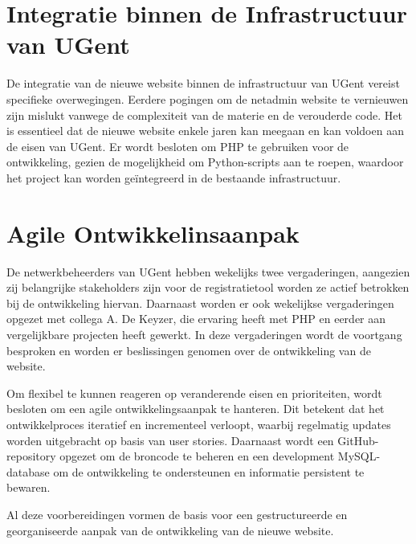 \section{Integratie binnen de Infrastructuur van UGent}
De integratie van de nieuwe website binnen de infrastructuur van UGent vereist specifieke overwegingen. Eerdere pogingen om de netadmin website te vernieuwen zijn mislukt vanwege de complexiteit van de materie en de verouderde code. Het is essentieel dat de nieuwe website enkele jaren kan meegaan en kan voldoen aan de eisen van UGent. Er wordt besloten om PHP te gebruiken voor de ontwikkeling, gezien de mogelijkheid om Python-scripts aan te roepen, waardoor het project kan worden geïntegreerd in de bestaande infrastructuur.

\section{Agile Ontwikkelinsaanpak} %
De netwerkbeheerders van UGent hebben wekelijks twee vergaderingen, aangezien zij belangrijke stakeholders zijn voor de registratietool worden ze actief betrokken bij de ontwikkeling hiervan. Daarnaast worden er ook wekelijkse vergaderingen opgezet met collega A. De Keyzer, die ervaring heeft met PHP en eerder aan vergelijkbare projecten heeft gewerkt. In deze vergaderingen wordt de voortgang besproken en worden er  beslissingen genomen over de ontwikkeling van de website.

Om flexibel te kunnen reageren op veranderende eisen en prioriteiten, wordt besloten om een agile ontwikkelingsaanpak te hanteren. Dit betekent dat het ontwikkelproces iteratief en incrementeel verloopt, waarbij regelmatig updates worden uitgebracht op basis van user stories. Daarnaast wordt een GitHub-repository opgezet om de broncode te beheren en een development MySQL-database om de ontwikkeling te ondersteunen en informatie persistent te bewaren.

Al deze voorbereidingen vormen de basis voor een gestructureerde en georganiseerde aanpak van de ontwikkeling van de nieuwe website.
